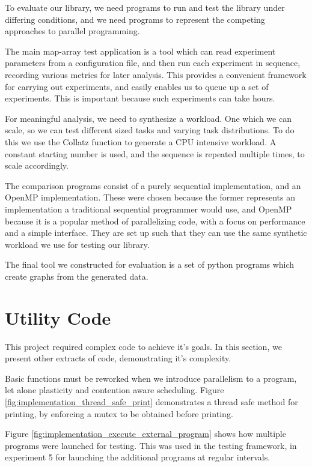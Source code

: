 To evaluate our library, we need programs to run and test the library under differing conditions, and we need programs to represent the competing approaches to parallel programming. 

The main map-array test application is a tool which can read experiment parameters from a configuration file, and then run each experiment in sequence, recording various metrics for later analysis. This provides a convenient framework for carrying out experiments, and easily enables us to queue up a set of experiments. This is important because such experiments can take hours.

For meaningful analysis, we need to synthesize a workload. One which we can scale, so we can test different sized tasks and varying task distributions. To do this we use the Collatz function to generate a CPU intensive workload. A constant starting number is used, and the sequence is repeated multiple times, to scale accordingly.

The comparison programs consist of a purely sequential implementation, and an OpenMP implementation. These were chosen because the former represents an implementation a traditional sequential programmer would use, and OpenMP because it is a popular method of parallelizing code, with a focus on performance and a simple interface. They are set up such that they can use the same synthetic workload we use for testing our library.

The final tool we constructed for evaluation is a set of python programs which create graphs from the generated data.



\section{Utility Code}

This project required complex code to achieve it's goals. In this section, we present other extracts of code, demonstrating it's complexity. 

Basic functions must be reworked when we introduce parallelism to a program, let alone plasticity and contention aware scheduling. Figure \ref{fig:implementation_thread_safe_print} demonstrates a thread safe method for printing, by enforcing a mutex to be obtained before printing.

Figure \ref{fig:implementation_execute_external_program} shows how multiple programs were launched for testing. This was used in the testing framework, in experiment 5 for launching the additional programs at regular intervals.

